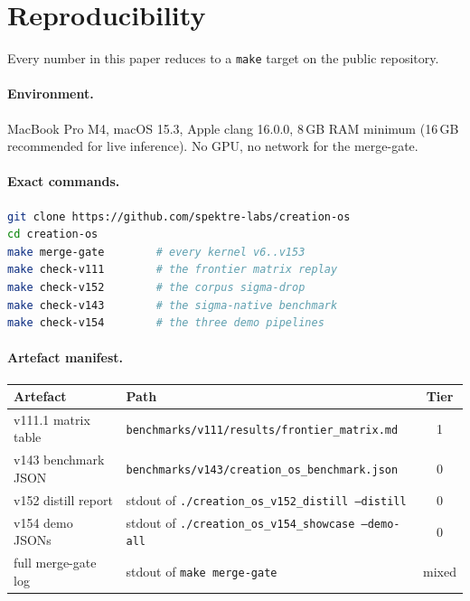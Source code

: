 \documentclass[11pt,letterpaper]{article}
\newcommand{\code}[1]{\texttt{#1}}
\begin{document}
\section{Reproducibility}

Every number in this paper reduces to a \code{make} target on the
public repository.

\paragraph{Environment.} MacBook Pro M4, macOS 15.3, Apple clang
16.0.0, 8\,GB RAM minimum (16\,GB recommended for live inference).
No GPU, no network for the merge-gate.

\paragraph{Exact commands.}
\begin{lstlisting}[language=bash]
git clone https://github.com/spektre-labs/creation-os
cd creation-os
make merge-gate        # every kernel v6..v153
make check-v111        # the frontier matrix replay
make check-v152        # the corpus sigma-drop
make check-v143        # the sigma-native benchmark
make check-v154        # the three demo pipelines
\end{lstlisting}

\paragraph{Artefact manifest.}

\begin{center}
\begin{tabular}{@{}llc@{}}
\toprule
Artefact & Path & Tier \\
\midrule
v111.1 matrix table & \code{benchmarks/v111/results/frontier\_matrix.md} & 1 \\
v143 benchmark JSON & \code{benchmarks/v143/creation\_os\_benchmark.json} & 0 \\
v152 distill report & stdout of \code{./creation\_os\_v152\_distill --distill} & 0 \\
v154 demo JSONs     & stdout of \code{./creation\_os\_v154\_showcase --demo-all} & 0 \\
full merge-gate log & stdout of \code{make merge-gate} & mixed \\
\bottomrule
\end{tabular}
\end{center}
\end{document}
